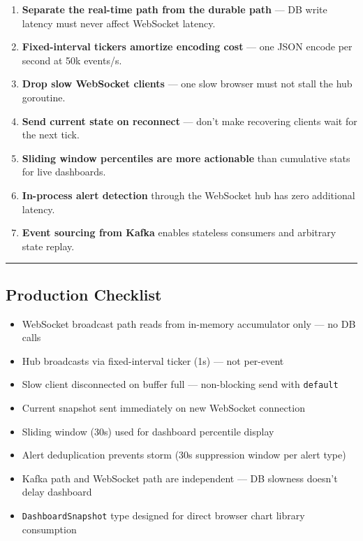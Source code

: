 \documentclass[
]{article}
\providecommand{\tightlist}{%
  \setlength{\itemsep}{0pt}\setlength{\parskip}{0pt}}
\begin{document}
\begin{enumerate}
\def\labelenumi{\arabic{enumi}.}
\tightlist
\item
  \textbf{Separate the real-time path from the durable path} --- DB
  write latency must never affect WebSocket latency.
\item
  \textbf{Fixed-interval tickers amortize encoding cost} --- one JSON
  encode per second at 50k events/s.
\item
  \textbf{Drop slow WebSocket clients} --- one slow browser must not
  stall the hub goroutine.
\item
  \textbf{Send current state on reconnect} --- don't make recovering
  clients wait for the next tick.
\item
  \textbf{Sliding window percentiles are more actionable} than
  cumulative stats for live dashboards.
\item
  \textbf{In-process alert detection} through the WebSocket hub has zero
  additional latency.
\item
  \textbf{Event sourcing from Kafka} enables stateless consumers and
  arbitrary state replay.
\end{enumerate}

\begin{center}\rule{0.5\linewidth}{0.5pt}\end{center}

\hypertarget{production-checklist-1}{%
\subsection{Production Checklist}\label{production-checklist-1}}

\begin{itemize}
\tightlist
\item[$\square$]
  WebSocket broadcast path reads from in-memory accumulator only --- no
  DB calls
\item[$\square$]
  Hub broadcasts via fixed-interval ticker (1s) --- not per-event
\item[$\square$]
  Slow client disconnected on buffer full --- non-blocking send with
  \texttt{default}
\item[$\square$]
  Current snapshot sent immediately on new WebSocket connection
\item[$\square$]
  Sliding window (30s) used for dashboard percentile display
\item[$\square$]
  Alert deduplication prevents storm (30s suppression window per alert
  type)
\item[$\square$]
  Kafka path and WebSocket path are independent --- DB slowness doesn't
  delay dashboard
\item[$\square$]
  \texttt{DashboardSnapshot} type designed for direct browser chart
  library consumption
\end{itemize}
\end{document}
